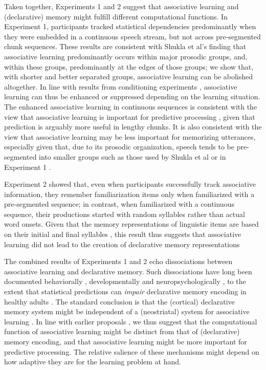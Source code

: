\documentclass[]{article}
\begin{document}
Taken together, Experiments 1 and 2 suggest that associative learning and (declarative) memory might fulfill different computational functions. In Experiment 1, participants tracked statistical dependencies predominantly when they were embedded in a continuous speech stream, but not across pre-segmented chunk sequences. These results are consistent with Shukla et al's \citep{Shukla2007} finding that associative learning predominantly occurs within major prosodic groups, and, within these groups, predominantly at the edges of those groups; we show that, with shorter and better separated groups, associative learning can be abolished altogether. In line with results from conditioning experiments \citep{Alberts1984, Garcia1974, Gubernick1984, Martin1979}, associative learning can thus be enhanced or suppressed depending on the learning situation. The enhanced associative learning in continuous sequences 
is consistent with the view that associative learning is important for predictive processing  \citep{Turk-Browne2010, Sherman2020}, given that prediction is arguably more useful in lengthy chunks. It is also consistent with the view that associative learning may be less important for memorizing utterances, especially given that, due to its prosodic organization, speech tends to be pre-segmented into smaller groups such as those used by Shukla et al \citep{Shukla2007} or in Experiment 1 \citep{Cutler1997, Shattuck-Hufnagel1996, Brentari2011, Endress-cross-seg, Fenlon2008, Pilon1981, Christophe2001}.

Experiment 2 showed that, even when participants successfully track associative information, they remember familiarization items only when familiarized with a pre-segmented sequence; in contrast, when familiarized with a continuous sequence, their productions started with random syllables rather than actual word onsets. Given that the memory representations of linguistic items are based on their initial and final syllables \citep{Endress-Phantoms-Vision, Fischer-Baum2011}, this result thus suggests that associative learning did not lead to the creation of declarative memory representations

The combined results of Experiments 1 and 2 echo dissociations between associative learning and declarative memory. Such dissociations have long been documented behaviorally \citep{Graf1984}, developmentally \citep{Finn2016} and neuropsychologically \citep{Knowlton1996a, Rungratsameetaweemana2019, Poldrack2001, Squire1992}, to the extent that statistical predictions can \emph{impair} declarative memory encoding in healthy adults \citep{Sherman2020}. The standard conclusion is that the (cortical) declarative memory system might be independent of a (neostriatal) system for associative learning \citep{Knowlton1996a, Poldrack2001, Squire1992}. In line with earlier proposals \citep{Turk-Browne2010, Sherman2020}, we thus suggest that the computational function of associative learning might be distinct from that of (declarative) memory encoding, and that associative learning might be more important for predictive processing. The relative salience of these mechanisms might depend on how adaptive they are for the learning problem at hand.
\end{document}
